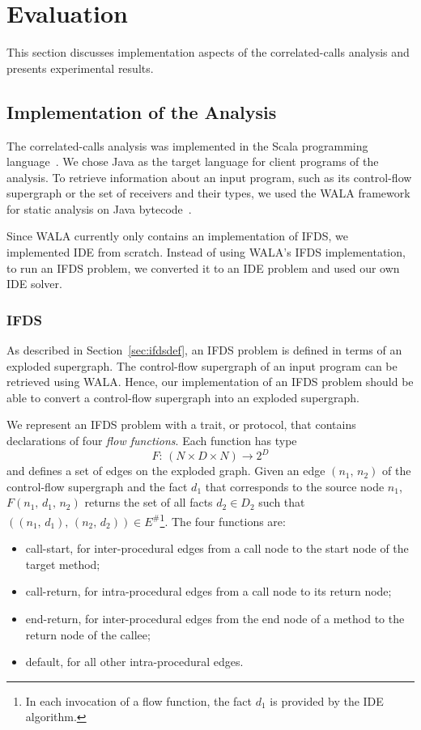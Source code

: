 \section{Evaluation}\label{chapter:eval}

This section discusses implementation aspects of the correlated-calls analysis and presents experimental results.

\subsection{Implementation of the Analysis}
The correlated-calls analysis was implemented in the Scala programming language~\cite{odersky2004overview}. 
We chose Java as the target language for client programs of the analysis.
To retrieve information about an input program, such as its control-flow supergraph or the set of receivers and their types, we used the WALA framework for static analysis on Java bytecode~\cite{fink2012wala}.

Since WALA currently only contains an implementation of IFDS, we implemented IDE from scratch. Instead of using WALA's IFDS implementation, to run an IFDS problem, we converted it to an IDE problem and used our own IDE solver.

\subsubsection{IFDS}
As described in Section~\ref{sec:ifdsdef}, an IFDS problem is defined in terms of an exploded supergraph. The control-flow supergraph of an input program can be retrieved using WALA. Hence, our implementation of an IFDS problem should be able to convert a control-flow supergraph into an exploded supergraph.

We represent an IFDS problem with a trait, or protocol, that contains declarations of four \textit{flow functions}. Each function has type 
\[
  F:\,(N\times D\times N)\to2^D
\]
and defines a set of edges on the exploded graph. 
Given an edge $(n_1,\,n_2)$ of the control-flow supergraph and the fact $d_1$ that 
corresponds to the source node $n_1$, $F(n_1,\,d_1,\,n_2)$ returns the set of all facts $d_2\in D_2$ such that $((n_1,\,d_1),\,(n_2,\,d_2))\in E^\#$\footnote{In each invocation of a flow function, the fact $d_1$ is provided by the IDE algorithm.}.
The four functions are:
\begin{itemize}
  \item \textsf{call-start}, for inter-procedural edges from a call node to the start node of the target method;
  \item \textsf{call-return}, for intra-procedural edges from a call node to its return node;
  \item \textsf{end-return}, for inter-procedural edges from the end node of a method to the return node of the callee;
  \item \textsf{default}, for all other intra-procedural edges.
\end{itemize}

